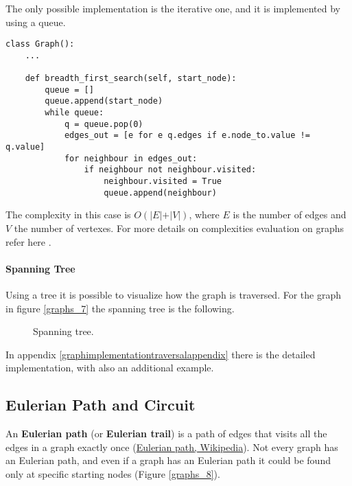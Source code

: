 The only possible implementation is the iterative one, and it is implemented by using a queue.

\begin{lstlisting}[firstnumber=1, caption={Recursive implementation of a depth-first search.}]
class Graph():
	...
	
	def breadth_first_search(self, start_node):
  		queue = []
		queue.append(start_node)
  		while queue:
    		q = queue.pop(0)
    		edges_out = [e for e q.edges if e.node_to.value != q.value]
    		for neighbour in edges_out:
      			if neighbour not neighbour.visited:
        			neighbour.visited = True
        			queue.append(neighbour)
\end{lstlisting}

The complexity in this case is \(O(\vert E \vert + \vert V \vert)\), where \(E\) is the number of edges and \(V\) the number of vertexes. For more details on complexities evaluation on graphs refer here \cite{goodrich2013data}.

\paragraph{Spanning Tree}
Using a tree it is possible to visualize how the graph is traversed. For the graph in figure \ref{graphs_7} the spanning tree is the following.

\begin{figure}[H]
\centering
{}  
\caption[Spanning tree.]{Spanning tree.}
\label{graphs_spanning_tree}
\end{figure}

In appendix \ref{graphimplementationtraversalappendix} there is the detailed implementation, with also an additional example.
\subsection{Eulerian Path and Circuit}
An \textbf{Eulerian path} (or \textbf{Eulerian trail}) is a path of edges that visits all the edges in a graph exactly once \cite{wikieulerianpathcircuit} (\href{https://en.wikipedia.org/wiki/Eulerian_path}{Eulerian path, Wikipedia}). Not every graph has an Eulerian path, and even if a graph has an Eulerian path it could be found only at specific starting nodes (Figure \ref{graphs_8}).

